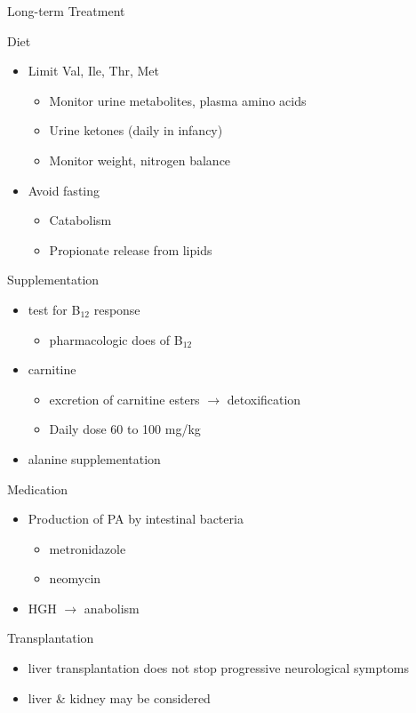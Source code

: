 \documentclass[presentation, smaller]{beamer}
\begin{document}
\begin{frame}[label={sec:orgheadline23}]{Long-term Treatment}
\begin{block}{Diet}
\begin{itemize}
\item Limit Val, Ile, Thr, Met
\begin{itemize}
\item Monitor urine metabolites, plasma amino acids
\item Urine ketones (daily in infancy)
\item Monitor weight, nitrogen balance
\end{itemize}

\item Avoid fasting
\begin{itemize}
\item Catabolism
\item Propionate release from lipids
\end{itemize}
\end{itemize}
\end{block}

\begin{block}{Supplementation}
\begin{itemize}
\item test for B\(_{\text{12}}\) response
\begin{itemize}
\item pharmacologic does of B\(_{\text{12}}\)
\end{itemize}
\item carnitine
\begin{itemize}
\item excretion of carnitine esters \(\to\) detoxification
\item Daily dose 60 to 100 mg/kg
\end{itemize}
\item alanine supplementation
\end{itemize}
\end{block}

\begin{block}{Medication}
\begin{itemize}
\item Production of PA by intestinal bacteria
\begin{itemize}
\item metronidazole
\item neomycin
\end{itemize}
\item HGH \(\to\) anabolism
\end{itemize}
\end{block}

\begin{block}{Transplantation}
\begin{itemize}
\item liver transplantation does not stop progressive neurological symptoms
\item liver \& kidney may be considered
\end{itemize}
\end{block}
\end{frame}
\end{document}
